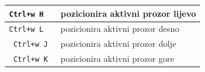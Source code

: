 \documentclass[10pt]{article}
\begin{document}
\begin{tabular}{|>{\tt}p{9.00cm}|>{}p{15.50cm}|}
        Ctrl+w H                                    & pozicionira aktivni prozor lijevo                                             \\ \hline
        Ctrl+w L                                    & pozicionira aktivni prozor desno                                              \\ \hline
        Ctrl+w J                                    & pozicionira aktivni prozor dolje                                              \\ \hline
        Ctrl+w K                                    & pozicionira aktivni prozor gore                                               \\ \hline
    \end{tabular}         
    \newpage              

\end{document}
